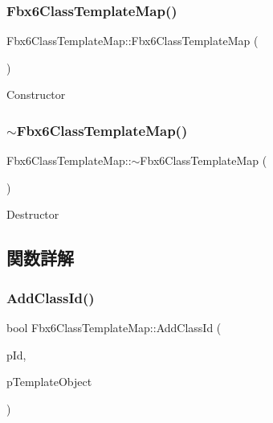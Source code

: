 \subsubsection{\texorpdfstring{Fbx6\+Class\+Template\+Map()}{Fbx6ClassTemplateMap()}}
{\footnotesize\ttfamily Fbx6\+Class\+Template\+Map\+::\+Fbx6\+Class\+Template\+Map (\begin{DoxyParamCaption}{ }\end{DoxyParamCaption})}

Constructor \mbox{\label{class_fbx6_class_template_map_af1b623f6de8fefd4c4515a66e40a2bec}} 
\subsubsection{\texorpdfstring{$\sim$\+Fbx6\+Class\+Template\+Map()}{~Fbx6ClassTemplateMap()}}
{\footnotesize\ttfamily Fbx6\+Class\+Template\+Map\+::$\sim$\+Fbx6\+Class\+Template\+Map (\begin{DoxyParamCaption}{ }\end{DoxyParamCaption})}

Destructor 

\subsection{関数詳解}
\mbox{\label{class_fbx6_class_template_map_a064f7a5f731932c34a257fe9947c3981}} 
\subsubsection{\texorpdfstring{Add\+Class\+Id()}{AddClassId()}}
{\footnotesize\ttfamily bool Fbx6\+Class\+Template\+Map\+::\+Add\+Class\+Id (\begin{DoxyParamCaption}\item[{\hyperlink{class_fbx_class_id}{Fbx\+Class\+Id}}]{p\+Id,  }\item[{\hyperlink{class_fbx_object}{Fbx\+Object} $\ast$}]{p\+Template\+Object }\end{DoxyParamCaption})}

